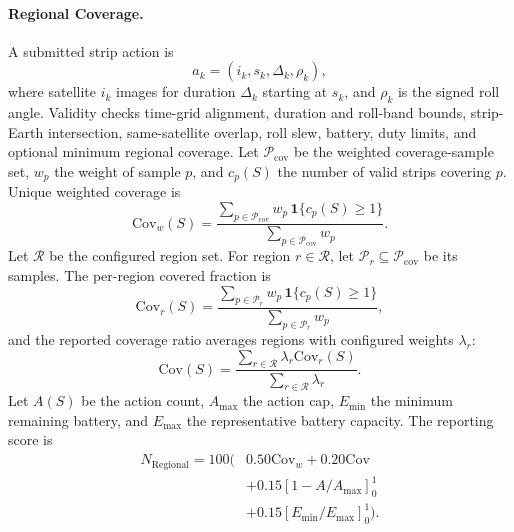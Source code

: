 \documentclass[11pt]{article}
\begin{document}
\paragraph{Regional Coverage.} A submitted strip action is
\[
  a_k=(i_k,s_k,\Delta_k,\rho_k),
\]
where satellite \(i_k\) images for duration \(\Delta_k\) starting at \(s_k\), and \(\rho_k\) is the signed roll angle. Validity checks time-grid alignment, duration and roll-band bounds, strip-Earth intersection, same-satellite overlap, roll slew, battery, duty limits, and optional minimum regional coverage. Let \(\mathcal{P}_{\mathrm{cov}}\) be the weighted coverage-sample set, \(w_p\) the weight of sample \(p\), and \(c_p(S)\) the number of valid strips covering \(p\). Unique weighted coverage is
\[
  \mathrm{Cov}_w(S)=
  \frac{\sum_{p\in\mathcal{P}_{\mathrm{cov}}} w_p\,\mathbf{1}\{c_p(S)\ge 1\}}{\sum_{p\in\mathcal{P}_{\mathrm{cov}}}w_p}.
\]
Let \(\mathcal{R}\) be the configured region set. For region \(r\in\mathcal{R}\), let \(\mathcal{P}_r\subseteq\mathcal{P}_{\mathrm{cov}}\) be its samples. The per-region covered fraction is
\[
  \mathrm{Cov}_r(S)=
  \frac{\sum_{p\in\mathcal{P}_r} w_p\,\mathbf{1}\{c_p(S)\ge 1\}}{\sum_{p\in\mathcal{P}_r}w_p},
\]
and the reported coverage ratio averages regions with configured weights \(\lambda_r\):
\[
  \mathrm{Cov}(S)=
  \frac{\sum_{r\in\mathcal{R}} \lambda_r\mathrm{Cov}_r(S)}{\sum_{r\in\mathcal{R}}\lambda_r}.
\]
Let \(A(S)\) be the action count, \(A_{\max}\) the action cap, \(E_{\min}\) the minimum remaining battery, and \(E_{\max}\) the representative battery capacity. The reporting score is
\[
  \begin{aligned}
  N_{\mathrm{Regional}}=100(&0.50\mathrm{Cov}_w+0.20\mathrm{Cov}\\
  &+0.15[1-A/A_{\max}]_0^1\\
  &+0.15[E_{\min}/E_{\max}]_0^1).
  \end{aligned}
\]
\end{document}
